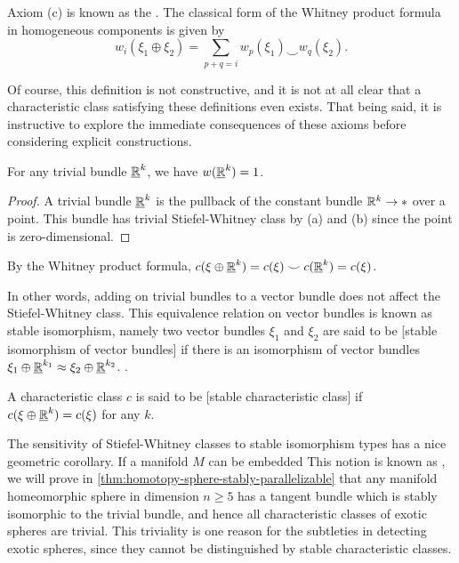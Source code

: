 \begin{remark}
	Axiom (c) is known as the . The classical form of the Whitney product formula in homogeneous components is given by
	\[
		w_i(\xi_1\oplus \xi_2) = \sum_{p+q=i} w_p(\xi_1)\smile w_q(\xi_2).
	\]
\end{remark}

Of course, this definition is not constructive, and it is not at all clear that a characteristic class satisfying these definitions even exists. That being said, it is instructive to explore the immediate consequences of these axioms before considering explicit constructions.

\begin{corollary}
	For any trivial bundle $\underline{\mathbb{R}}^k$, we have $w(\underline{\mathbb{R}}^k)=1$.
\end{corollary}
\begin{proof}
	A trivial bundle $\underline{\mathbb{R}}^k$ is the pullback of the constant bundle $\mathbb{R}^k\to *$ over a point. This bundle has trivial Stiefel-Whitney class by (a) and (b) since the point is zero-dimensional.
\end{proof}

\begin{corollary}
	By the Whitney product formula, $c(\xi\oplus \underline{\mathbb{R}}^k)=c(\xi)\smile c(\underline{\mathbb{R}}^k)= c(\xi)$.
\end{corollary}

In other words, adding on trivial bundles to a vector bundle does not affect the Stiefel-Whitney class. This equivalence relation on vector bundles is known as stable isomorphism, namely two vector bundles $\xi_1$ and $\xi_2$ are said to be [stable isomorphism of vector bundles] if there is an isomorphism of vector bundles $\xi_1\oplus \underline{\mathbb{R}}^{k_1} \approx \xi_2\oplus \underline{\mathbb{R}}^{k_2}$. . 

\begin{definition}
	A characteristic class $c$ is said to be [stable characteristic class] if $c(\xi\oplus \underline{\mathbb{R}}^k) = c(\xi)$ for any $k$.
\end{definition}

The sensitivity of Stiefel-Whitney classes to stable isomorphism types has a nice geometric corollary. If a manifold $M$ can be embedded 
This notion is known as , 
we will prove in \cref{thm:homotopy-sphere-stably-parallelizable} that any manifold homeomorphic sphere in dimension $n\geq 5$ has a tangent bundle which is stably isomorphic to the trivial bundle, and hence all characteristic classes of exotic spheres are trivial. This triviality is one reason for the subtleties in detecting exotic spheres, since they cannot be distinguished by stable characteristic classes. 

